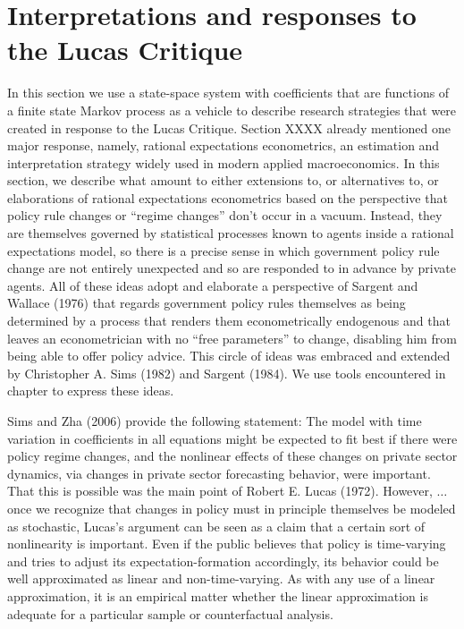 

\paper

\overfullrule=0pt
\def\frac#1#2{#1\over #2}
%
\def\bmatrix#1{\left[ \matrix{#1} \right]}
\def\be{{\beta}}
\def\toone{{t+1}}

\overfullrule=0pt

\section{Interpretations and responses to the Lucas Critique}
In this section we use a  state-space system with coefficients that are functions of a finite state Markov process as a vehicle to describe 
research strategies that were created in response to the Lucas Critique.  Section XXXX already mentioned one major response, namely,
rational expectations econometrics, an estimation and interpretation strategy widely used in modern applied macroeconomics. 
In this section, we describe what amount to either extensions to, or  alternatives to, or elaborations of rational expectations econometrics based
on the perspective that policy rule changes or ``regime changes'' don't occur in a vacuum.  Instead, they are themselves governed by statistical processes known to agents inside a rational expectations model, so there is a precise sense in which government policy rule change
are not entirely unexpected and so are responded to in advance by private agents.
All of these ideas adopt and elaborate a perspective of Sargent and Wallace (1976) that regards government policy rules themselves as being
determined by a process that renders them econometrically endogenous and that leaves an econometrician with no ``free parameters'' to change,
disabling him from being able to offer policy advice.  This circle of ideas was embraced and extended by
 Christopher A. Sims (1982) and Sargent (1984).
 We use tools encountered in chapter  to  express these ideas.   



Sims and Zha (2006) provide the following statement:
\example
 The model with time variation in coefficients in all equations might be expected to fit best if there were policy regime changes, and the nonlinear effects of these changes on private sector dynamics, via changes in private sector forecasting behavior, were important. That this is possible was the main point of Robert E. Lucas (1972).
However, $\ldots$ %
once we recognize that changes in policy must in principle themselves be modeled as stochastic, Lucas's argument can be seen as a claim that a certain sort of nonlinearity is important. Even if the public believes that policy is time-varying and tries to adjust its expectation-formation accordingly, its behavior could be well approximated as linear and non-time-varying. As with any use of a linear approximation, it is an empirical matter whether the linear approximation is adequate for a particular sample or counterfactual analysis.
\endexample


